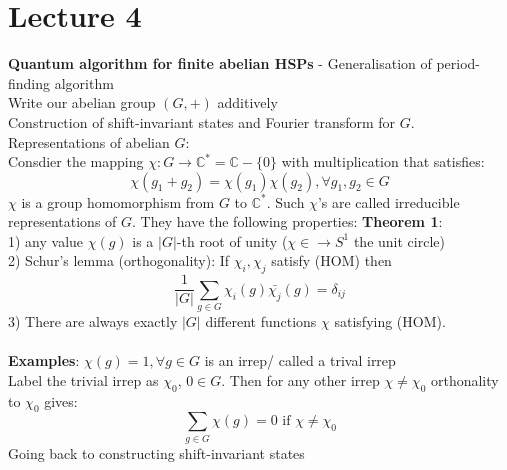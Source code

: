 \documentclass{article}
\begin{document}
\section{Lecture 4}
\textbf{Quantum algorithm for finite abelian HSPs}
- Generalisation of period-finding algorithm\\
Write our abelian group $(G, +)$ additively\\
Construction of shift-invariant states and Fourier transform for $G$.\\
Representations of abelian $G$:\\
Consdier the mapping $\chi: G \rightarrow \mathbb{C}^* = \mathbb{C}- \{ 0\}$ with multiplication that satisfies:
$$
\chi( g_1 + g_2) = \chi(g_1) \chi(g_2), \forall g_1,g_2 \in G 
$$
$\chi$ is a group homomorphism from $G$ to $\mathbb{C}^*$. Such $\chi$'s are called irreducible representations of $G$. They have the following properties:
\textbf{Theorem 1}:\\
1) any value $\chi(g)$ is a $|G|$-th root of unity ($\chi \in \rightarrow S^1$ the unit circle)\\
2) Schur's lemma (orthogonality): If $\chi_i,\chi_j$ satisfy (HOM) then 
$$
\frac{1}{|G|} \sum_{g \in G} \chi_i (g) \bar {\chi_j} (g) = \delta_{ij}
$$
3) There are always exactly $|G|$ different functions $\chi$ satisfying (HOM).\\\\
\textbf{Examples}: $\chi(g) = 1, \forall g \in G$ is an irrep/ called a trival irrep\\
Label the trivial irrep as $\chi_0$, $0\in G$. Then for any other irrep $\chi \neq \chi_0$ orthonality to $\chi_0$ gives:
$$
\sum_{g \in G} \chi(g) = 0 \text{ if } \chi \neq \chi_0
$$
Going back to constructing shift-invariant states
\end{document}

